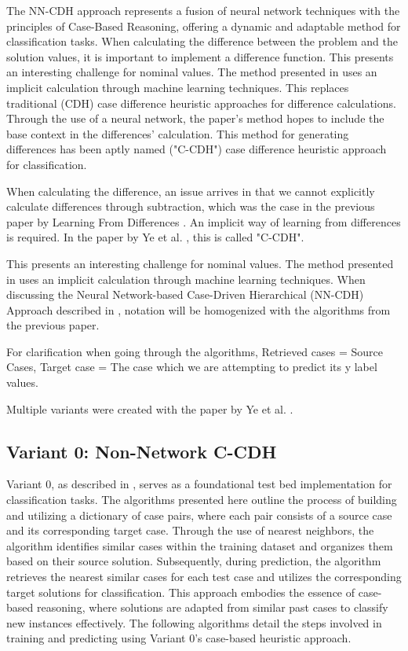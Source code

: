 \documentclass[a4paper, 12pt]{report}
\begin{document}
The NN-CDH approach represents a fusion of neural network techniques with the principles of Case-Based Reasoning, offering a dynamic and adaptable method for classification tasks. 
When calculating the difference between the problem and the solution values, it is important to implement a difference function. This presents an interesting challenge for nominal values. 
The method presented in \cite{ye2021learning} uses an implicit calculation through machine learning techniques. This replaces traditional (CDH) case difference heuristic approaches for difference calculations. 
Through the use of a neural network, the paper's method hopes to include the base context in the differences' calculation. This method for generating differences has been aptly named ("C-CDH") case difference heuristic approach for classification.

When calculating the difference, an issue arrives in that we cannot explicitly calculate differences through subtraction, which was the case in the previous paper by Learning From Differences \cite{learningFromDifferences2022}. 
An implicit way of learning from differences is required. In the paper by Ye et al. \cite{ye2021learning}, this is called "C-CDH".

This presents an interesting challenge for nominal values. The method presented in \cite{ye2021learning} uses an implicit calculation through machine learning techniques. 
When discussing the Neural Network-based Case-Driven Hierarchical (NN-CDH) Approach described in \cite{ye2021learning}, notation will be homogenized with the algorithms from the previous paper.

For clarification when going through the algorithms, Retrieved cases = Source Cases, Target case = The case which we are attempting to predict its y label values.

Multiple variants were created with the paper by Ye et al. \cite{ye2021learning}.

\subsection{Variant 0: Non-Network C-CDH}

Variant 0, as described in \cite{ye2021learning}, serves as a foundational test bed implementation for classification tasks. 
The algorithms presented here outline the process of building and utilizing a dictionary of case pairs, where each pair consists of a source case and its corresponding target case. 
Through the use of nearest neighbors, the algorithm identifies similar cases within the training dataset and organizes them based on their source solution. Subsequently, during prediction, the algorithm retrieves the nearest similar cases for each test case and utilizes the corresponding target solutions for classification. 
This approach embodies the essence of case-based reasoning, where solutions are adapted from similar past cases to classify new instances effectively. The following algorithms detail the steps involved in training and predicting using Variant 0's case-based heuristic approach.
\end{document}
